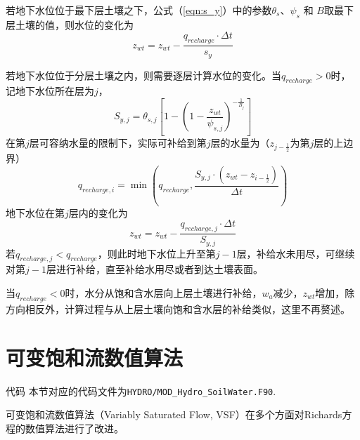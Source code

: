 若地下水位位于最下层土壤之下，公式（\ref{eqn:s_y}）中的参数$\theta_s$、$\psi_s$ 和 $B$取最下层土壤的值，则水位的变化为
\begin{equation}
z_{w t}=z_{w t}-\frac{q_{recharge} \cdot \Delta t}{s_{y}}
\end{equation}

若地下水位位于分层土壤之内，则需要逐层计算水位的变化。当$q_{recharge}>0$时，记地下水位所在层为$j$，
\begin{equation}
{S}_{y,j}=\theta_{s,j}\left[1-\left(1-\frac{z_{wt}}{\psi_{s,j}}\right)^{-\frac{1}{B_j}}\right]
\end{equation}
在第$j$层可容纳水量的限制下，实际可补给到第$j$层的水量为（$z_{j-\frac{1}{2}}$为第$j$层的上边界）
\begin{equation}
q_{recharge, i}=\min \left(q_{recharge}, \frac{S_{y,j} \cdot \left(z_{w t}-z_{i-\frac{1}{2}}\right)}{\Delta t} \right)  
\end{equation}
地下水位在第$j$层内的变化为
\begin{equation}
z_{w t}=z_{w t}-\frac{q_{recharge,j} \cdot \Delta t}{S_{y,j}}
\end{equation}
若$q_{recharge,j}<q_{recharge}$，则此时地下水位上升至第$j-1$层，补给水未用尽，可继续对第$j-1$层进行补给，直至补给水用尽或者到达土壤表面。

当$q_{recharge}<0$时，水分从饱和含水层向上层土壤进行补给，$w_a$减少，$z_{wt}$增加，除方向相反外，计算过程与从上层土壤向饱和含水层的补给类似，这里不再赘述。

\section{可变饱和流数值算法}

\begin{mymdframed}{代码}
本节对应的代码文件为\texttt{HYDRO/MOD\_Hydro\_SoilWater.F90}.
\end{mymdframed}

可变饱和流数值算法（Variably Saturated Flow, VSF）\citep{dai2019vsf}在多个方面对Richards方程的数值算法进行了改进。

